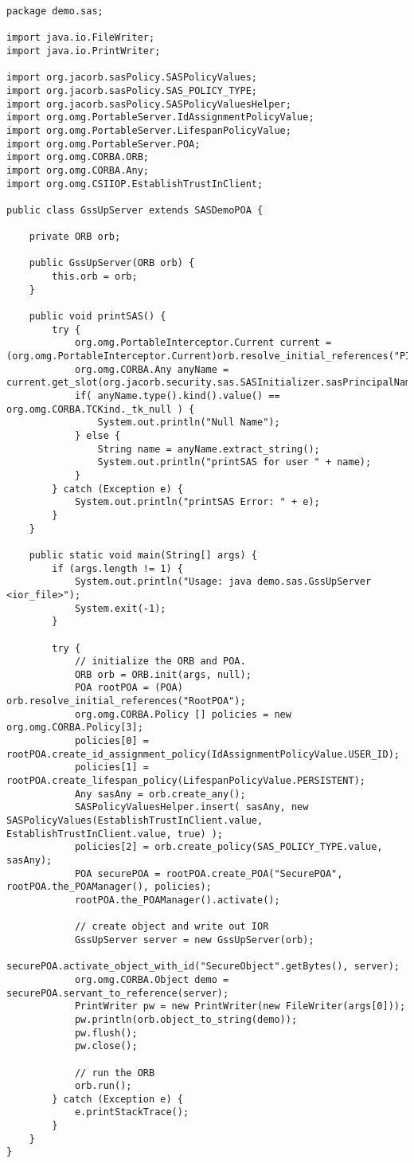 \begin{scriptsize}
\begin{verbatim}
package demo.sas;

import java.io.FileWriter;
import java.io.PrintWriter;

import org.jacorb.sasPolicy.SASPolicyValues;
import org.jacorb.sasPolicy.SAS_POLICY_TYPE;
import org.jacorb.sasPolicy.SASPolicyValuesHelper;
import org.omg.PortableServer.IdAssignmentPolicyValue;
import org.omg.PortableServer.LifespanPolicyValue;
import org.omg.PortableServer.POA;
import org.omg.CORBA.ORB;
import org.omg.CORBA.Any;
import org.omg.CSIIOP.EstablishTrustInClient;

public class GssUpServer extends SASDemoPOA {

	private ORB orb;

	public GssUpServer(ORB orb) {
		this.orb = orb;
	}

	public void printSAS() {
		try {
			org.omg.PortableInterceptor.Current current = (org.omg.PortableInterceptor.Current)orb.resolve_initial_references("PICurrent");
			org.omg.CORBA.Any anyName = current.get_slot(org.jacorb.security.sas.SASInitializer.sasPrincipalNamePIC);
			if( anyName.type().kind().value() == org.omg.CORBA.TCKind._tk_null ) {
				System.out.println("Null Name");
			} else {
				String name = anyName.extract_string();
				System.out.println("printSAS for user " + name);
			}
		} catch (Exception e) {
			System.out.println("printSAS Error: " + e);
		}
	}

	public static void main(String[] args) {
		if (args.length != 1) {
			System.out.println("Usage: java demo.sas.GssUpServer <ior_file>");
			System.exit(-1);
		}

		try {
			// initialize the ORB and POA.
			ORB orb = ORB.init(args, null);
			POA rootPOA = (POA) orb.resolve_initial_references("RootPOA");
			org.omg.CORBA.Policy [] policies = new org.omg.CORBA.Policy[3];
			policies[0] = rootPOA.create_id_assignment_policy(IdAssignmentPolicyValue.USER_ID);
			policies[1] = rootPOA.create_lifespan_policy(LifespanPolicyValue.PERSISTENT);
			Any sasAny = orb.create_any();
			SASPolicyValuesHelper.insert( sasAny, new SASPolicyValues(EstablishTrustInClient.value, EstablishTrustInClient.value, true) );
			policies[2] = orb.create_policy(SAS_POLICY_TYPE.value, sasAny);
			POA securePOA = rootPOA.create_POA("SecurePOA", rootPOA.the_POAManager(), policies);
 			rootPOA.the_POAManager().activate();
			
			// create object and write out IOR
			GssUpServer server = new GssUpServer(orb);
			securePOA.activate_object_with_id("SecureObject".getBytes(), server);
			org.omg.CORBA.Object demo = securePOA.servant_to_reference(server);
			PrintWriter pw = new PrintWriter(new FileWriter(args[0]));
			pw.println(orb.object_to_string(demo));
			pw.flush();
			pw.close();
			
			// run the ORB
			orb.run();
		} catch (Exception e) {
			e.printStackTrace();
		}
	}
}
\end{verbatim}
\end{scriptsize}

